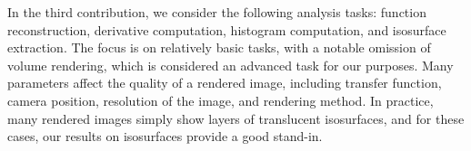 In the third contribution, we consider the following analysis tasks: function reconstruction,
derivative computation, histogram computation, and isosurface extraction. The focus is on relatively
basic tasks, with a notable omission of volume rendering, which is considered an advanced task for
our purposes. Many parameters affect the quality of a rendered image, including transfer function,
camera position, resolution of the image, and rendering method. In practice, many rendered images
simply show layers of translucent isosurfaces, and for these cases, our results on isosurfaces
provide a good stand-in.


